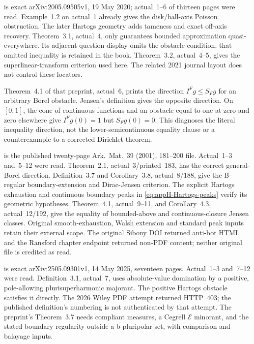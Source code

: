 \cite{NilssonWikstrom20QuasiboundedV1} is exact arXiv:2005.09505v1,
19 May 2020; actual~1--6 of thirteen pages were read.
Example~1.2 on actual~1 already gives the disk/ball-axis Poisson
obstruction. The later Hartogs geometry adds tameness and exact
off-axis recovery. Theorem~3.1, actual~4, only guarantees bounded
approximation quasi-everywhere. Its adjacent question display omits
the obstacle condition; that omitted inequality is retained in the book.
Theorem~3.2, actual~4--5, gives the superlinear-transform criterion
used here. The related 2021 journal layout does not control these locators.

Theorem~4.1 of that preprint, actual~6, prints the direction
$I^F g\leq S_F g$ for an arbitrary Borel obstacle. Jensen's definition
gives the opposite direction. On $[0,1]$, the cone of continuous
functions and an obstacle equal to one at zero and zero elsewhere
give $I^F g(0)=1$ but $S_F g(0)=0$. This diagnoses the literal
inequality direction, not the lower-semicontinuous equality clause
or a counterexample to a corrected Dirichlet theorem.

\cite{Wikstrom01JensenPublished} is the published twenty-page
Ark.~Mat.~39 (2001), 181--200 file. Actual~1--3 and~5--12 were read.
Theorem~2.1, actual~3/printed~183, has the correct general-Borel
direction. Definition~3.7 and Corollary~3.8, actual~8/188, give the
B-regular boundary-extension and Dirac-Jensen criterion. The explicit
Hartogs exhaustion and continuous boundary peaks in
\eqref{eq:appH-Hartogs-peaks} verify its geometric hypotheses.
Theorem~4.1, actual~9--11, and Corollary~4.3, actual~12/192, give
the equality of bounded-above and continuous-closure Jensen classes.
Original smooth-exhaustion, Walsh extension and standard peak inputs
retain their external scope. The original Sibony DOI returned anti-bot
HTML and the Ransford chapter endpoint returned non-PDF content;
neither original file is credited as read.

\cite{Nilsson25QuasiboundedSolutionsV1} is exact arXiv:2505.09301v1,
14 May 2025, seventeen pages. Actual~1--3 and~7--12 were read.
Definition~3.1, actual~7, uses absolute-value domination by a positive,
pole-allowing plurisuperharmonic majorant. The positive Hartogs obstacle
satisfies it directly. The 2026 Wiley PDF attempt returned HTTP~403;
the published definition's numbering is not authenticated by that attempt.
The preprint's Theorem~3.7 needs compliant measures, a Cegrell
$\mathcal E$ minorant, and the stated boundary regularity outside a
b-pluripolar set, with comparison and balayage inputs.

